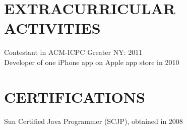 \documentclass{res}
\begin{document}
\begin{resume}
\section{EXTRACURRICULAR ACTIVITIES}
    \vspace{0.05in}
    Contestant in ACM-ICPC Greater NY: 2011\\
    Developer of one iPhone app on Apple app store in 2010

 \section{CERTIFICATIONS}
  \vspace{0.05in}
    Sun Certified Java Programmer (SCJP), obtained in 2008\\

\end{resume}
\end{document}
